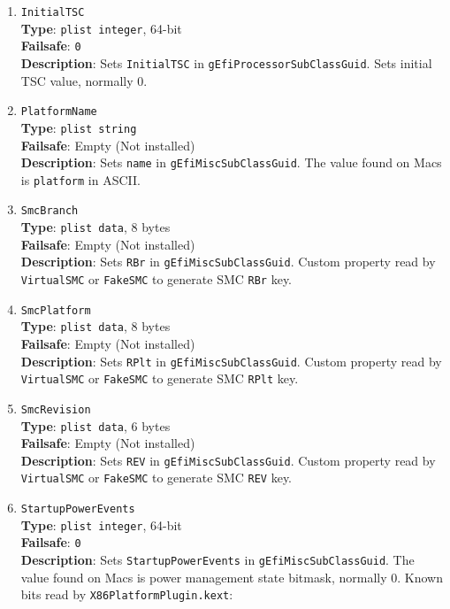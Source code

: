 \documentclass[]{article}
\begin{document}
\begin{enumerate}
  Sets CPU FSB frequency. This value equals to CPU nominal frequency divided
  by CPU maximum bus ratio and is specified in Hz. Refer to
  \texttt{MSR\_NEHALEM\_PLATFORM\_INFO}~(\texttt{CEh}) MSR value to determine
  maximum bus ratio on modern Intel CPUs.

  \emph{Note}: This value is not used on Skylake and newer but is still provided
  to follow suit.
\item
  \texttt{InitialTSC}\\
  \textbf{Type}: \texttt{plist\ integer}, 64-bit\\
  \textbf{Failsafe}: \texttt{0}\\
  \textbf{Description}: Sets \texttt{InitialTSC} in
  \texttt{gEfiProcessorSubClassGuid}. Sets initial TSC value, normally 0.
\item
  \texttt{PlatformName}\\
  \textbf{Type}: \texttt{plist\ string}\\
  \textbf{Failsafe}: Empty (Not installed)\\
  \textbf{Description}: Sets \texttt{name} in
  \texttt{gEfiMiscSubClassGuid}. The value found on Macs is
  \texttt{platform} in ASCII.
\item
  \texttt{SmcBranch}\\
  \textbf{Type}: \texttt{plist\ data}, 8 bytes\\
  \textbf{Failsafe}: Empty (Not installed)\\
  \textbf{Description}: Sets \texttt{RBr} in
  \texttt{gEfiMiscSubClassGuid}. Custom property read by
  \texttt{VirtualSMC} or \texttt{FakeSMC} to generate SMC \texttt{RBr}
  key.
\item
  \texttt{SmcPlatform}\\
  \textbf{Type}: \texttt{plist\ data}, 8 bytes\\
  \textbf{Failsafe}: Empty (Not installed)\\
  \textbf{Description}: Sets \texttt{RPlt} in
  \texttt{gEfiMiscSubClassGuid}. Custom property read by
  \texttt{VirtualSMC} or \texttt{FakeSMC} to generate SMC \texttt{RPlt}
  key.
\item
  \texttt{SmcRevision}\\
  \textbf{Type}: \texttt{plist\ data}, 6 bytes\\
  \textbf{Failsafe}: Empty (Not installed)\\
  \textbf{Description}: Sets \texttt{REV} in
  \texttt{gEfiMiscSubClassGuid}. Custom property read by
  \texttt{VirtualSMC} or \texttt{FakeSMC} to generate SMC \texttt{REV}
  key.
\item
  \texttt{StartupPowerEvents}\\
  \textbf{Type}: \texttt{plist\ integer}, 64-bit\\
  \textbf{Failsafe}: \texttt{0}\\
  \textbf{Description}: Sets \texttt{StartupPowerEvents} in
  \texttt{gEfiMiscSubClassGuid}. The value found on Macs is power management
  state bitmask, normally 0. Known bits read by
  \texttt{X86PlatformPlugin.kext}:


\end{enumerate}
\end{document}
